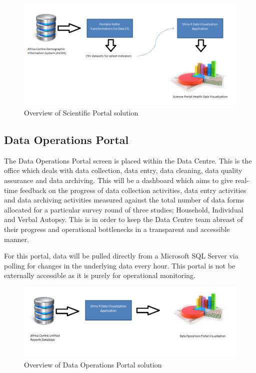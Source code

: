 \begin{figure}[h] 
\centering
\includegraphics[scale=0.4]{./Chapter4/images/scienceportaloverview}%
\caption{Overview of Scientific Portal solution }
\label{fig1}
\end{figure}

\subsection{Data Operations Portal}
The Data Operations Portal screen is placed within the Data Centre. This is the office which deals with data collection, data entry, data cleaning, data quality assurance and data archiving. This will be a dashboard which aims to give real-time feedback on the progress of data collection activities, data entry activities and data archiving activities measured against the total number of data forms allocated for a particular survey round of three studies; Household, Individual and Verbal Autopsy. This is in order to keep the Data Centre team abreast of their progress and operational bottlenecks in a transparent and accessible manner.

For this portal, data will be pulled directly from a Microsoft SQL Server via polling for changes in the underlying data every hour.
This portal is not be externally accessible as it is purely for operational monitoring.

\begin{figure}[!ht] 
\centering
\includegraphics[scale=0.4]{./Chapter4/images/operationsportaloverview}
\caption{Overview of Data Operations Portal solution }
\label{fig2}
\end{figure}

